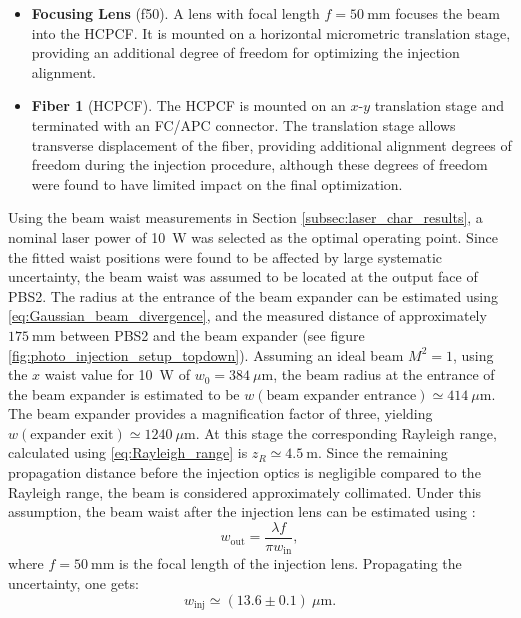 \begin{itemize}
    \item \textbf{Focusing Lens} (f50). A lens with focal length $f=50~\mathrm{mm}$ focuses the beam into the HCPCF. It is mounted on a horizontal micrometric translation stage, providing an additional degree of freedom for optimizing the injection alignment.
    
    \item \textbf{Fiber 1} (HCPCF). The HCPCF is mounted on an $x$-$y$ translation stage and terminated with an FC/APC connector. The translation stage allows transverse displacement of the fiber, providing additional alignment degrees of freedom during the injection procedure, although these degrees of freedom were found to have limited impact on the final optimization.
\end{itemize}

Using the beam waist measurements in Section \ref{subsec:laser_char_results}, a nominal laser power of 10~W was selected as the optimal operating point. Since the fitted waist positions were found to be affected by large systematic uncertainty, the beam waist was assumed to be located at the output face of PBS2. The radius at the entrance of the beam expander can be estimated using \eqref{eq:Gaussian_beam_divergence}, and the measured distance of approximately $175~\mathrm{mm}$ between PBS2 and the beam expander (see figure \ref{fig:photo_injection_setup_topdown}).
Assuming an ideal beam $M^2=1$, using the $x$ waist value for 10~W of $w_0=384~\mu\mathrm{m}$, the beam radius at the entrance of the beam expander is estimated to be $w(\text{beam expander entrance}) \simeq 414~\mu\mathrm{m}$.\\
The beam expander provides a magnification factor of three, yielding $w(\text{expander exit}) \simeq 1240~\mu\mathrm{m}$.
At this stage the corresponding Rayleigh range, calculated using \ref{eq:Rayleigh_range} is $z_R\simeq4.5~\mathrm{m}$. Since the remaining propagation distance before the injection optics is negligible compared to the Rayleigh range, the beam is considered approximately collimated. Under this assumption, the beam waist after the  injection lens can be estimated using \cite{salehteich2019}:
\begin{equation}
    \label{eq:gaussian_waist_lens}
    w_\text{out} = \frac{\lambda f}{\pi w_\text{in}},
\end{equation}
where $f=50~\mathrm{mm}$ is the focal length of the injection lens.
Propagating the uncertainty, one gets:
\begin{equation*}
    w_\text{inj} \simeq (13.6 \pm 0.1)~\mu\mathrm{m}.
\end{equation*}
